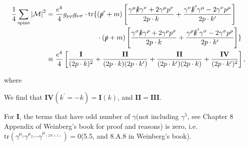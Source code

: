 \begin{align}
    \frac{1}{4}\sum_{\mathrm{spins}}\left| \mathcal{M} \right|^2 &=
    \begin{aligned}[t]
        \frac{e^4}{4}g_{\mu\rho}g_{\nu\sigma}\cdot\mathrm{tr}
        \{
            &(\slashed{p}^\prime+m)
            \left[
                \frac{\gamma^\mu\slashed{k}\gamma^\nu+2\gamma^\mu p^\nu}{2p\cdot k}
                + \frac{\gamma^\nu\slashed{k}^\prime\gamma^\mu-2\gamma^\nu p^\mu}{2p\cdot k^\prime}
            \right] \notag \\
            &\cdot(\slashed{p}+m)
            \left[
                \frac{\gamma^\sigma\slashed{k}\gamma^\rho+2\gamma^\rho p^\sigma}{2p\cdot k}
                + \frac{\gamma^\rho\slashed{k}^\prime\gamma^\sigma-2\gamma^\sigma p^\rho}{2p\cdot k^\prime}
            \right]
        \} \notag \\
    \end{aligned} \\
    &\equiv \frac{e^4}{4}
    \left[
        \frac{\mathbf{I}}{(2p\cdot k)^2} + \frac{\mathbf{II}}{(2p\cdot k)(2p\cdot k^\prime)}
        + \frac{\mathbf{II}}{(2p\cdot k^\prime)(2p\cdot k)} + \frac{\mathbf{IV}}{(2p\cdot k^\prime)^2}
    \right],
\end{align}

where


We find that $\mathbf{IV}(k^\prime = -k) = \mathbf{I}(k)$,
and $\mathbf{II}=\mathbf{III}$.

For $\mathbf{I}$,
the terms that have odd number of $\gamma$(not including $\gamma^5$, see Chapter 8 Appendix of Weinberg's book for proof and reasons) is zero,
i.e. $\mathrm{tr}(\gamma^{\mu_1}\gamma^{\mu_2}\cdots\gamma^{\mu_(2N+1)})=0$(5.5, and 8.A.8 in Weinberg's book).


